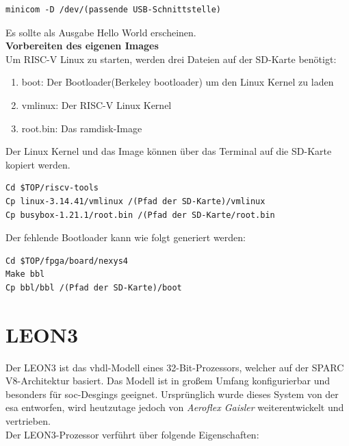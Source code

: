 \begin{lstlisting}[caption={Aufruf des \emph{Minicom}},label={code:minicom}]
minicom -D /dev/(passende USB-Schnittstelle)
\end{lstlisting}


Es sollte als Ausgabe Hello World erscheinen.\\

\textbf{Vorbereiten des eigenen Images}\\

Um RISC-V Linux zu starten, werden drei Dateien auf der SD-Karte benötigt:
\begin{enumerate}
  \item boot: Der Bootloader(Berkeley bootloader) um den Linux Kernel zu laden
  \item vmlinux: Der RISC-V Linux Kernel
  \item root.bin: Das ramdisk-Image
\end{enumerate}

\vspace{5mm}
Der Linux Kernel und das Image können über das Terminal auf die SD-Karte kopiert werden.

\begin{lstlisting}
Cd $TOP/riscv-tools
Cp linux-3.14.41/vmlinux /(Pfad der SD-Karte)/vmlinux
Cp busybox-1.21.1/root.bin /(Pfad der SD-Karte/root.bin
\end{lstlisting}


Der fehlende Bootloader kann wie folgt generiert werden:\\

\begin{lstlisting}
Cd $TOP/fpga/board/nexys4
Make bbl
Cp bbl/bbl /(Pfad der SD-Karte)/boot
\end{lstlisting}

\newpage

\section{LEON3}\label{kap:leon3}

Der LEON3 ist das \ac{vhdl}-Modell eines 32-Bit-Prozessors, welcher auf der SPARC V8-Architektur basiert. Das Modell ist in großem Umfang konfigurierbar und besonders für \ac{soc}-Desgings geeignet.
Ursprünglich wurde dieses System von der \ac{esa} entworfen, wird heutzutage jedoch von \emph{Aeroflex Gaisler} weiterentwickelt und vertrieben.\\
Der LEON3-Prozessor verführt über folgende Eigenschaften:\cite{leon}\\

